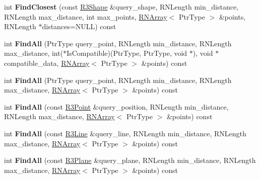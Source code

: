 \begin{DoxyCompactItemize}
\item 
int {\bfseries Find\+Closest} (const \hyperlink{class_r3_shape}{R3\+Shape} \&query\+\_\+shape, R\+N\+Length min\+\_\+distance, R\+N\+Length max\+\_\+distance, int max\+\_\+points, \hyperlink{class_r_n_array}{R\+N\+Array}$<$ Ptr\+Type $>$ \&points, R\+N\+Length $\ast$distances=N\+U\+LL) const \hypertarget{class_r3_kdtree_add13c72c12771eb76b48f0b242f3018b}{}\label{class_r3_kdtree_add13c72c12771eb76b48f0b242f3018b}

\item 
int {\bfseries Find\+All} (Ptr\+Type query\+\_\+point, R\+N\+Length min\+\_\+distance, R\+N\+Length max\+\_\+distance, int($\ast$Is\+Compatible)(Ptr\+Type, Ptr\+Type, void $\ast$), void $\ast$compatible\+\_\+data, \hyperlink{class_r_n_array}{R\+N\+Array}$<$ Ptr\+Type $>$ \&points) const \hypertarget{class_r3_kdtree_a9884c61d556922cb0a5d29e651589272}{}\label{class_r3_kdtree_a9884c61d556922cb0a5d29e651589272}

\item 
int {\bfseries Find\+All} (Ptr\+Type query\+\_\+point, R\+N\+Length min\+\_\+distance, R\+N\+Length max\+\_\+distance, \hyperlink{class_r_n_array}{R\+N\+Array}$<$ Ptr\+Type $>$ \&points) const \hypertarget{class_r3_kdtree_a4f740206a7671cece60de427420a1cc1}{}\label{class_r3_kdtree_a4f740206a7671cece60de427420a1cc1}

\item 
int {\bfseries Find\+All} (const \hyperlink{class_r3_point}{R3\+Point} \&query\+\_\+position, R\+N\+Length min\+\_\+distance, R\+N\+Length max\+\_\+distance, \hyperlink{class_r_n_array}{R\+N\+Array}$<$ Ptr\+Type $>$ \&points) const \hypertarget{class_r3_kdtree_a40b2dfbdbabdb7a96a58f7d90d28abd6}{}\label{class_r3_kdtree_a40b2dfbdbabdb7a96a58f7d90d28abd6}

\item 
int {\bfseries Find\+All} (const \hyperlink{class_r3_line}{R3\+Line} \&query\+\_\+line, R\+N\+Length min\+\_\+distance, R\+N\+Length max\+\_\+distance, \hyperlink{class_r_n_array}{R\+N\+Array}$<$ Ptr\+Type $>$ \&points) const \hypertarget{class_r3_kdtree_a0794669497a02d7facde99a531e98599}{}\label{class_r3_kdtree_a0794669497a02d7facde99a531e98599}

\item 
int {\bfseries Find\+All} (const \hyperlink{class_r3_plane}{R3\+Plane} \&query\+\_\+plane, R\+N\+Length min\+\_\+distance, R\+N\+Length max\+\_\+distance, \hyperlink{class_r_n_array}{R\+N\+Array}$<$ Ptr\+Type $>$ \&points) const \hypertarget{class_r3_kdtree_a1adb80cf66a3330dcd88bd5317c7baa3}{}\label{class_r3_kdtree_a1adb80cf66a3330dcd88bd5317c7baa3}


\end{DoxyCompactItemize}
